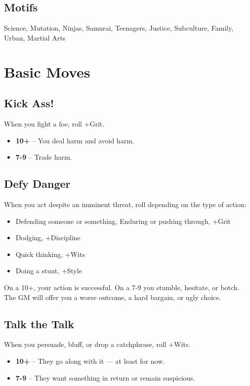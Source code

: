 \documentclass{book}
\begin{document}
\section*{Motifs}
Science, Mutation, Ninjas, Samurai, Teenagers, Justice, Subculture, Family, Urban, Martial Arts


\chapter*{Basic Moves}

\section*{Kick Ass!}
When you fight a foe, roll +Grit.
\begin{itemize}
    \item \textbf{10+} -- You deal harm and avoid harm.
    \item \textbf{7-9} -- Trade harm.
\end{itemize}

\section*{Defy Danger}
When you act despite an imminent threat, roll depending on the type of action:
\begin{itemize}
    \item Defending someone or something, Enduring or pushing through, +Grit
    \item Dodging, +Discipline
    \item Quick thinking, +Wits
    \item Doing a stunt, +Style
\end{itemize}
On a 10+, your action is successful. On a 7-9 you stumble, hesitate, or botch. The GM will offer you a worse outcome, a hard bargain, or ugly choice. 

\section*{Talk the Talk}
When you persuade, bluff, or drop a catchphrase, roll +Wits.
\begin{itemize}
    \item \textbf{10+} -- They go along with it — at least for now.
    \item \textbf{7-9} -- They want something in return or remain suspicious.
\end{itemize}
\end{document}
